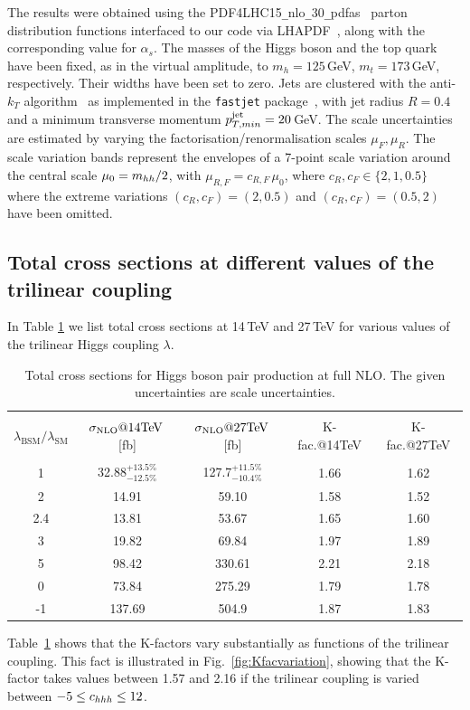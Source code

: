 
The results were obtained using the
PDF4LHC15{\tt\_}nlo{\tt\_}30{\tt\_}pdfas~\cite{Butterworth:2015oua,CT14,MMHT14,NNPDF}
parton distribution functions interfaced to our code via
LHAPDF~\cite{Buckley:2014ana}, along with the corresponding value for
$\alpha_s$.  The masses of the Higgs boson and the top quark have been
fixed, as in the virtual amplitude, to $m_h=125$\,GeV, $m_t=173$\,GeV,
respectively. Their widths have been set to zero.   
Jets are clustered with the
anti-$k_T$ algorithm~\cite{Cacciari:2008gp} as implemented in the
{\tt fastjet} package~\cite{Cacciari:2005hq, Cacciari:2011ma}, with jet
radius $R=0.4$ and a minimum transverse momentum 
$p_{T,min}^{\rm{jet}}=20$\,GeV.  The scale uncertainties are
estimated by varying the factorisation/renormalisation scales
$\mu_{F}, \mu_{R}$. The scale variation bands 
represent the envelopes of a 7-point scale variation
around the central scale $\mu_0 =m_{hh}/2$, with
$\mu_{R,F}=c_{R,F}\,\mu_0$, where $c_R,c_F\in \{2,1,0.5\}$ where the
extreme variations $(c_R,c_F)=(2,0.5)$ and $(c_R,c_F)=(0.5,2)$ have
been omitted.

\subsection{Total cross sections at different values of the trilinear coupling}

In Table \ref{tab:sigmatot} we list total cross sections at 14\,TeV and 27\,TeV for various values of the trilinear Higgs coupling $\lambda$. 
\begin{table}[htb]
\begin{center}
\begin{tabular}{| c | c | c |c|c|}
\hline
&&&&\\
$\lambda_{\mathrm{BSM}}/\lambda_{\mathrm{SM}}$ & $\sigma_{\rm{NLO}}@14 \mathrm{TeV}$\,[fb] & $\sigma_{\rm{NLO}}@27 \mathrm{TeV}$\,[fb] &K-fac.@14TeV&K-fac.@27TeV\\
&&&&\\
\hline
1& 32.88$^{+13.5\%}_{-12.5\%}$&127.7$^{+11.5\%}_{-10.4\%}$ &1.66&1.62\\
\hline
2 & 14.91 &  59.10 & 1.58 & 1.52\\
\hline
2.4 & 13.81& 53.67 & 1.65 & 1.60\\
\hline
3& 19.82 & 69.84 & 1.97 & 1.89\\
\hline 
5 & 98.42& 330.61 & 2.21 & 2.18\\
\hline 
0 & 73.84& 275.29& 1.79 & 1.78 \\
\hline 
-1 & 137.69& 504.9 & 1.87 & 1.83\\
\hline
\end{tabular}
\end{center}
\caption{Total cross sections for Higgs boson pair production at full NLO. The given uncertainties are scale uncertainties. 
\label{tab:sigmatot}}
\end{table}
Table~\ref{tab:sigmatot} shows that the K-factors vary substantially as functions of the trilinear coupling.
This fact is illustrated in Fig.~\ref{fig:Kfacvariation}, showing that the K-factor takes values between 1.57 and 2.16
if the trilinear coupling is varied between $-5\leq c_{hhh}\leq 12$.

